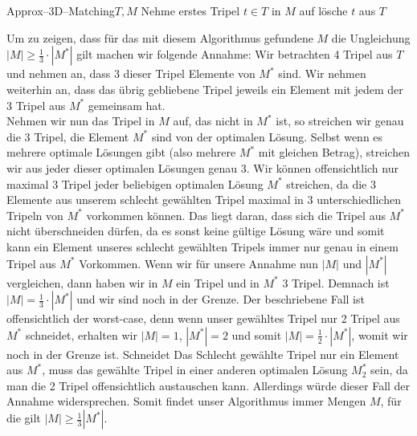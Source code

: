 \documentclass[a4paper]{article}
\begin{document}
	\section{}
		\begin{pseudocode}{Approx--3D--Matching}{$T,M$}
			\Repeat
				\State Nehme erstes Tripel $t\in T$ in $M$ auf
						\State lösche $t$ aus $T$
					\EndIf
				\EndFor
		\end{pseudocode}
		Um zu zeigen, dass für das mit diesem Algorithmus gefundene $M$ die Ungleichung $|M|\geq\frac{1}{3}\cdot |M^*|$ gilt machen wir folgende Annahme:\n
		Wir betrachten 4 Tripel aus $T$ und nehmen an, dass 3 dieser Tripel Elemente von $M^*$ sind.
		Wir nehmen weiterhin an, dass das übrig gebliebene Tripel jeweils ein Element mit jedem der 3 Tripel aus $M^*$ gemeinsam hat.\\
		Nehmen wir nun das Tripel in $M$ auf, das nicht in $M^*$ ist, so streichen wir genau die 3 Tripel, die Element $M^*$ sind von der optimalen Lösung.
		Selbst wenn es mehrere optimale Lösungen gibt (also mehrere $M^*$ mit gleichen Betrag), streichen wir aus jeder dieser optimalen Lösungen genau 3.\n
		Wir können offensichtlich nur maximal 3 Tripel jeder beliebigen optimalen Lösung $M^*$ streichen, da die 3 Elemente aus unserem schlecht gewählten Tripel maximal in 3 unterschiedlichen Tripeln von $M^*$ vorkommen können.
		Das liegt daran, dass sich die Tripel aus $M^*$ nicht überschneiden dürfen, da es sonst keine gültige Lösung wäre und somit kann ein Element unseres schlecht gewählten Tripels immer nur genau in einem Tripel aus $M^*$ Vorkommen.
		Wenn wir für unsere Annahme nun $|M|$ und $|M^*|$ vergleichen, dann haben wir in $M$ ein Tripel und in $M^*$ 3 Tripel. Demnach ist $|M|= \frac{1}{3}\cdot |M^*|$ und wir sind noch in der Grenze.\n
		Der beschriebene Fall ist offensichtlich der worst-case, denn wenn unser gewähltes Tripel nur 2 Tripel aus $M^*$ schneidet, erhalten wir $|M|=1$, $|M^*|=2$ und somit $|M|=\frac{1}{2}\cdot |M^*|$, womit wir noch in der Grenze ist. Schneidet Das Schlecht gewählte Tripel nur ein Element aus $M^*$, muss das gewählte Tripel in einer anderen optimalen Lösung $M_{2}^*$ sein, da man die 2 Tripel offensichtlich austauschen kann. Allerdings würde dieser Fall der Annahme widersprechen.\n
		Somit findet unser Algorithmus immer Mengen $M$, für die gilt $|M|\geq \frac{1}{3}|M^*|$.
\end{document}
